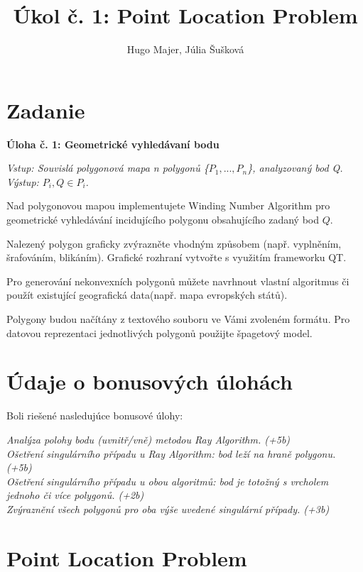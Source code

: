 \documentclass[11pt]{article}
\title{\textbf{Úkol č. 1: Point Location Problem}}
\author{Hugo Majer, Júlia Šušková}
\begin{document}
\maketitle

\newpage
{}
\section{Zadanie}

\textbf{Úloha č. 1: Geometrické vyhledávaní bodu}

\textit{Vstup: Souvislá polygonová mapa n polygonů \{$P_1, ..., P_n$\}, analyzovaný bod Q.}\\
\textit{Výstup: $P_i, Q \in P_i$.}

Nad polygonovou mapou implementujete Winding Number Algorithm pro geometrické vyhledávání incidujícího polygonu obsahujícího zadaný bod $Q$.

Nalezený polygon graficky zvýrazněte vhodným způsobem (např. vyplněním, šrafováním, blikáním). Grafické rozhraní vytvořte s využitím frameworku QT.

Pro generování nekonvexních polygonů můžete navrhnout vlastní algoritmus či použít existující geografická data(např. mapa evropských států).

Polygony budou načítány z textového souboru ve Vámi zvoleném formátu. Pro datovou reprezentaci jednotlivých
polygonů použijte špagetový model.

\newpage
\section{Údaje o bonusových úlohách}
Boli riešené nasledujúce bonusové úlohy:

\textit{Analýza polohy bodu (uvnitř/vně) metodou Ray Algorithm. (+5b)\\
Ošetření singulárního případu u Ray Algorithm: bod leží na hraně polygonu. (+5b)\\
Ošetření singulárního případu u obou algoritmů: bod je totožný s vrcholem jednoho či více polygonů. (+2b)\\
Zvýraznění všech polygonů pro oba výše uvedené singulární případy. (+3b)}

\setlength{\parindent}{1cm}
\newpage

\section{Point Location Problem} \label{plp}
\end{document}
